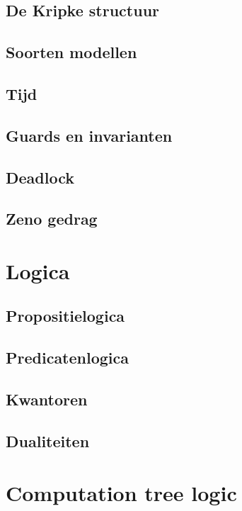 \documentclass{article}
\begin{document}
	\subsection{De Kripke structuur}
	
	\subsection{Soorten modellen}
	
	\subsection{Tijd}
	
	\subsection{Guards en invarianten}
	
	\subsection{Deadlock}
	
	\subsection{Zeno gedrag}
	
	\section{Logica}
	
	\subsection{Propositielogica}
	
	\subsection{Predicatenlogica}
	
	\subsection{Kwantoren}
	
	\subsection{Dualiteiten}
	
	\section{Computation tree logic}
	
\end{document}
